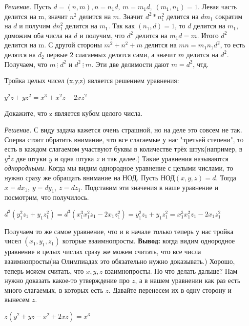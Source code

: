 \hspace{3mm}

\textit{Решение.} Пусть $d = (n,m), n = n_1d, \ m = m_1d, \ (m_1, n_1) = 1.$ Левая часть делится на m, значит $n^2$ делится на $m$. Значит $d^2*n_1^2$ делится на $dm_1$ сократим на $d$ и получим $dn_1^2$ делится на $m_1$. Так как $(n_1, d) = 1$, то $d$ делится на $m_1$, доможим оба числа на $d$ и получим, что $d^2$ делится на $m_1d = m$. Итого $d^2$ делится на m.
С другой стороны $m^2+n^2+m$ делится на $mn = m_1n_1d^2$, то есть делятся на $d_2$ первые $2$ слагаемых делятся сами, а значит $m$ делится на $d^2.$ Получаем, что $m \ \vdots \ d^2$ и $d^2 \ \vdots \ m$. Эти две делимости дают $m = d^2$, чтд.

\hspace{3mm}

 Тройка целых чисел (x,y,z) является решением уравнения:

\centerline{$y^2z + yz^2 = x^3 + x^2z - 2xz^2$} 

Докажите, что z   является кубом целого числа.

\hspace{3mm}

\textit{Решение.} С виду задача кажется очень страшной, но на деле это совсем не так. Сперва стоит обратить внимание, что все слагаемые у нас "третьей степени", то есть в каждом слагаемом участвуют буквы в количестве трёх штук(например, в $y^2z$ две штуки $y$ и одна штука $z$ и так далее.) Такие уравнения называются \textit{однородными.} Когда мы видим однородное уравнение с целыми числами, то нужно сразу же обращать внимание на НОД. Пусть НОД$(x, y, z) = d$. Тогда $x = dx_1, \ y = dy_1, \ z = dz_1$. Подставим эти значения в наше уравнение и посмотрим, что получилось. 

\centerline{$d^3(y_1^2z_1 + y_1z_1^2) = d^3(x_1^3 x_1^2z_1 - 2x_1z_1^2) = y_1^2z_1 + y_1z_1^2 = x_1^3 x_1^2z_1 - 2x_1z_1^2$}

Получаем то же самое уравнение, что и в начале только теперь у нас тройка чисел $(x_1, y_1, z_1)$ которые взаимнопросты. \textbf{Вывод:} когда видим однородное уравнение в целых числах сразу же можем считать, что все числа взаимнопросты(на Олимпиадах это обязательно нужно доказывать.) Хорошо, теперь можем считать, что $x, y, z$ взаимнопросты. Но что делать дальше? Нам нужно доказать какое-то утверждение про $z$, а в нашем уравнении как раз есть много слагаемых, в которых есть $z$. Давайте перенесем их в одну сторону и вынесем $z$. 

\centerline{$z(y^2 + yz - x^2 + 2xz) = x^3$}

